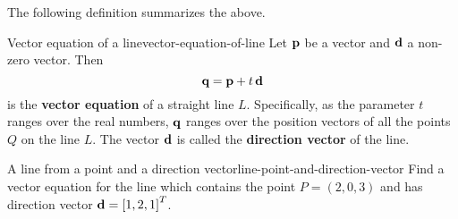 \begin{center}
\end{center}
The following definition summarizes the above.

\begin{definition}{Vector equation of a line}{vector-equation-of-line}
  Let $\mbox{\bf p}$ be a vector and $\mbox{\bf d}$ a non-zero vector. Then
  \begin{equation*}
    \mbox{\bf q} = \mbox{\bf p} + t\,\mbox{\bf d}
  \end{equation*}
  is the \textbf{vector equation}%
   of a
  straight line $L$. Specifically, as the parameter $t$ ranges over
  the real numbers, $\mbox{\bf q}$ ranges over the position vectors of all
  the points $Q$ on the line $L$.  The vector $\mbox{\bf d}$ is called the
  \textbf{direction vector}%
   of the line.
\end{definition}

\begin{example}{A line from a point and a direction vector}{line-point-and-direction-vector}
  Find a vector equation for the line which contains the point
  $P = (2,0,3)$ and has direction vector
  $\mbox{\bf d} = \left[1,2,1\right]^T$.
\end{example}

